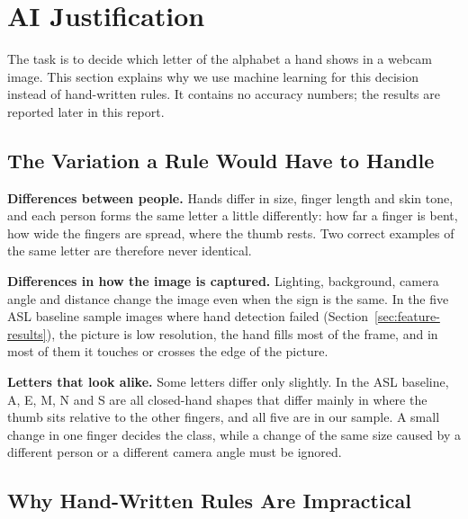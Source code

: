 \section{AI Justification}
\label{sec:ai-justification}

The task is to decide which letter of the alphabet a hand shows in a webcam image. This section explains why we use machine learning for this decision instead of hand-written rules. It contains no accuracy numbers; the results are reported later in this report.

\subsection{The Variation a Rule Would Have to Handle}

\textbf{Differences between people.} Hands differ in size, finger length and skin tone, and each person forms the same letter a little differently: how far a finger is bent, how wide the fingers are spread, where the thumb rests. Two correct examples of the same letter are therefore never identical.

\textbf{Differences in how the image is captured.} Lighting, background, camera angle and distance change the image even when the sign is the same. In the five ASL baseline sample images where hand detection failed (Section~\ref{sec:feature-results}), the picture is low resolution, the hand fills most of the frame, and in most of them it touches or crosses the edge of the picture.

\textbf{Letters that look alike.} Some letters differ only slightly. In the ASL baseline, A, E, M, N and S are all closed-hand shapes that differ mainly in where the thumb sits relative to the other fingers, and all five are in our sample. A small change in one finger decides the class, while a change of the same size caused by a different person or a different camera angle must be ignored.

\subsection{Why Hand-Written Rules Are Impractical}

